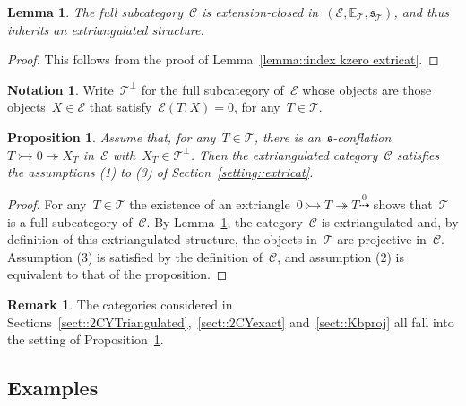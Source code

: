 \documentclass{amsart}
\newtheorem{corollary}[theorem]{Corollary}
\newtheorem{proposition}[theorem]{Proposition}
\newtheorem{lemma}[theorem]{Lemma}
\theoremstyle{definition}
\newtheorem{remark}[theorem]{Remark}
\newtheorem{notation}[theorem]{Notation}
\newcommand{\cat}{\mathcal{C}}
\newcommand{\tc}{\mathcal{T}}
\newcommand{\ec}{\mathcal{E}}
\newcommand{\infl}{\rightarrowtail}
\newcommand{\defl}{\twoheadrightarrow}
\begin{document}
\begin{lemma}
\label{lemma:: prT is extriangulated}
 The full subcategory~$\cat$ is extension-closed in~$(\ec,\mathbb{E}_\tc,\mathfrak{s}_\tc)$, and thus inherits an extriangulated structure.
\end{lemma}

\begin{proof}
 This follows from the proof of Lemma~\ref{lemma::index kzero extricat}.
\end{proof}

\begin{notation}
 Write~$\tc^\perp$ for the full subcategory of~$\ec$ whose objects are those objects~$X\in\ec$ that satisfy~$\ec(T,X)=0$, for any~$T\in\tc$.
\end{notation}

\begin{proposition}
\label{prop::prT}
Assume that, for any~$T\in\tc$, there is an~$\mathfrak{s}$-conflation~$T\infl 0\defl X_T$ in~$\ec$ with~$X_T\in\tc^\perp$.
Then the extriangulated category~$\cat$ satisfies the assumptions (1) to (3) of Section~\ref{setting::extricat}.
\end{proposition}

\begin{proof}
For any~$T\in\tc$ the existence of an extriangle~$0\infl T\defl T\overset{0}{\dashrightarrow}$ shows that~$\tc$ is a full subcategory of~$\cat$.
By Lemma~\ref{lemma:: prT is extriangulated}, the category~$\cat$ is extriangulated and, by definition of this extriangulated structure, the objects in~$\tc$ are projective in~$\cat$.
Assumption (3) is satisfied by the definition of~$\cat$, and assumption (2) is equivalent to that of the proposition.
\end{proof}

\begin{remark}
 The categories considered in Sections~\ref{sect::2CYTriangulated},~\ref{sect::2CYexact} and~\ref{sect::Kbproj} all fall into the setting of Proposition~\ref{prop::prT}.
\end{remark}




\subsection{Examples}
\end{document}
